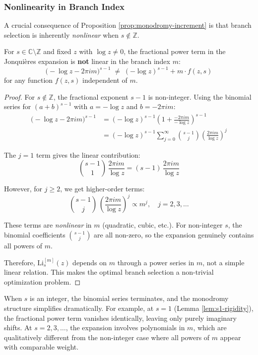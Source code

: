 \subsubsection{Nonlinearity in Branch Index}

A crucial consequence of Proposition \ref{prop:monodromy-increment} is that branch selection is inherently \emph{nonlinear} when $s\notin\mathbb{Z}$.

\begin{lemma}\label{lem:nonlinearity-m}
For $s\in\mathbb{C}\setminus\mathbb{Z}$ and fixed $z$ with $\log z \neq 0$, the fractional power term in the Jonquières expansion is \textbf{not} linear in the branch index $m$:
\begin{equation}
\bigl(-\log z - 2\pi im\bigr)^{s-1} \;\neq\; (-\log z)^{s-1} + m \cdot f(z,s)
\end{equation}
for any function $f(z,s)$ independent of $m$.
\end{lemma}

\begin{proof}
For $s\notin\mathbb{Z}$, the fractional exponent $s-1$ is non-integer. Using the binomial series for $(a+b)^{s-1}$ with $a = -\log z$ and $b = -2\pi im$:
\begin{align*}
\bigl(-\log z - 2\pi im\bigr)^{s-1} &= (-\log z)^{s-1}\left(1 + \frac{-2\pi im}{-\log z}\right)^{s-1} \\
&= (-\log z)^{s-1} \sum_{j=0}^\infty \binom{s-1}{j} \left(\frac{2\pi im}{\log z}\right)^j
\end{align*}

The $j=1$ term gives the linear contribution:
\[
\binom{s-1}{1}\,\frac{2\pi im}{\log z} = (s-1)\,\frac{2\pi im}{\log z}
\]

However, for $j\geq 2$, we get higher-order terms:
\[
\binom{s-1}{j}\,\left(\frac{2\pi im}{\log z}\right)^j \propto m^j, \quad j=2,3,\ldots
\]

These terms are \emph{nonlinear} in $m$ (quadratic, cubic, etc.). For non-integer $s$, the binomial coefficients $\binom{s-1}{j}$ are all non-zero, so the expansion genuinely contains all powers of $m$.

Therefore, $\mathrm{Li}_s^{[m]}(z)$ depends on $m$ through a power series in $m$, not a simple linear relation. This makes the optimal branch selection a non-trivial optimization problem.
\end{proof}

\begin{remark}
When $s$ is an integer, the binomial series terminates, and the monodromy structure simplifies dramatically. For example, at $s=1$ (Lemma \ref{lem:s1-rigidity}), the fractional power term vanishes identically, leaving only purely imaginary shifts. At $s=2,3,\ldots$, the expansion involves polynomials in $m$, which are qualitatively different from the non-integer case where all powers of $m$ appear with comparable weight.
\end{remark}


